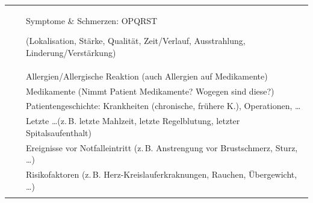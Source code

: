 {}
{}
{%
\begin{minipage}{\linewidth}
\FontTableBase
{\sffamily\FontTableBase\CorrectionItemizeBox\renewcommand{\itemhook}{%
  \setlength{\itemsep}{0.005\baselineskip}
  \setlength{\leftmargin}{1.4em}
  \setlength{\labelwidth}{0.9em}
}
\begin{tabulary}{\linewidth}[H]{lCL}
\toprule\addlinespace
{}
 &
{}
 &
Symptome {\&} Schmerzen: OPQRST

{\tiny(Lokalisation, Stärke,  Qualität, Zeit/Verlauf, 
 Ausstrahlung, Linderung/Verstärkung)}
\\\addlinespace
 &
{}
 &
Allergien/Allergische Reaktion (auch
Allergien auf Medikamente)
\\\addlinespace
 &
 {}
 &
Medikamente {\tiny(Nimmt Patient Medikamente?
Wogegen sind diese?)}
\\\addlinespace
 &
{}
 &
Patientengeschichte: Krankheiten {\tiny(chronische, frühere
K.)}, Operationen, \ldots 
\\\addlinespace
 &
 {}
 &
Letzte \ldots (z.\,B. letzte Mahlzeit, letzte
Regelblutung, letzter Spitalsaufenthalt)
\\\addlinespace
 &
 {}
 &
Ereignisse vor Notfalleintritt {\tiny(z.\,B.
Anstrengung vor Brustschmerz, Sturz, \ldots)}
\\\addlinespace
 &
 {}
 &
Risikofaktoren {\tiny(z.\,B.
Herz-Kreislauferkraknungen, Rauchen, Übergewicht, \ldots)}
\\\addlinespace\midrule\addlinespace


\end{tabulary}}
\end{minipage}}
